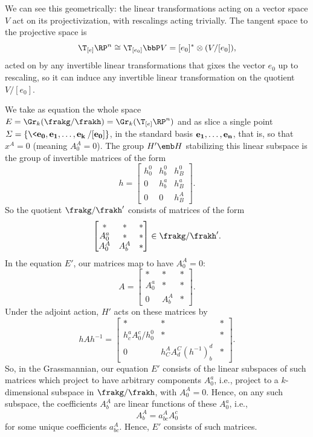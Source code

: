 We can see this geometrically: the linear transformations acting on a vector space $V$ act on its projectivization, with rescalings acting trivially. The tangent space to the projective space is 
\[\T_{[e]}\RP^n\cong \T_{[e_0]}\bbP V=[e_0]^\ast\otimes(V\slash [e_0]),\]
acted on by any invertible linear transformations that gixes the vector $e_0$ up to rescaling, so it can induce any invertible linear transformation on the quotient $V\slash [e_0]$.

We take as equation the whole space $E=\Gr_k(\frakg\slash\frakh)=\Gr_k(\T_{[e]}\RP^n)$ and as slice a single point $\varSigma=\{\<\bf{e}_0,\bf{e}_1,\ldots,\bf{e}_k\>\slash [\bf{e}_0]\}$, in the standard basis $\bf{e}_1,\ldots,\bf{e}_n$, that is, so that $x^A=0$ (meaning $A^A_0=0$). The group $H'\emb H$ stabilizing this linear subspace is the group of invertible matrices of the form 
\[h=\begin{bmatrix}
    h^0_0 & h^0_b & h^0_B\\
    0 & h^a_b & h^a_B\\
    0 & 0 & h^A_B
\end{bmatrix}.\]
So the quotient $\frakg\slash\frakh'$ consists of matrices of the form 
\[\begin{bmatrix}
    \ast & \ast & \ast \\
    A^a_0 & \ast & \ast \\
    A^A_0 & A^A_b & \ast
\end{bmatrix}\in \frakg\slash\frakh'.\]
In the equation $E'$, our matrices map to have $A^A_0=0$:
\[A=\begin{bmatrix}
    \ast & \ast & \ast \\
    A^a_0 & \ast & \ast \\
    0 & A^A_b & \ast
\end{bmatrix}.\]
Under the adjoint action, $H'$ acts on these matrices by 
\[hAh^{-1}=\begin{bmatrix}
    \ast & \ast & \ast\\
    h^a_c A^c_0/h^0_0 & \ast & \ast \\
    0 & h^A_C A^C_d(h^{-1})^d_b & \ast
\end{bmatrix}.\]
So, in the Grassmannian, our equation $E'$ consists of the linear subspaces of such matrices which project to have arbitrary components $A^a_0$, i.e., project to a $k$-dimensional subspace in $\frakg\slash\frakh$, with $A^A_0=0$. Hence, on any such subspace, the coefficients $A^A_b$ are linear functions of these $A^a_0$, i.e., 
\[A^A_b=a^A_{bc}A^c_0\]
for some unique coefficients $a^A_{bc}$. Hence, $E'$ consists of such matrices. 

